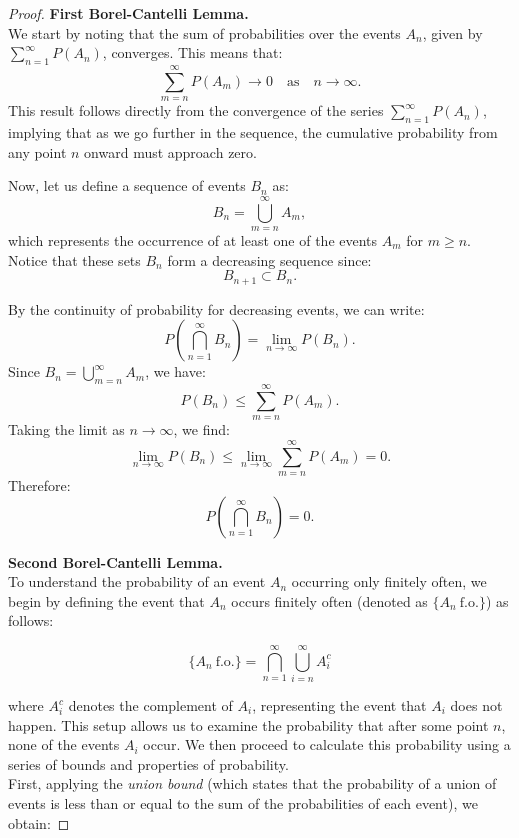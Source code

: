\begin{proof} \textbf{First Borel-Cantelli Lemma.}\\
    
    We start by noting that the sum of probabilities over the events \( A_n \), given by \( \sum_{n=1}^{\infty} P(A_n) \), converges. This means that:
\[
\sum_{m=n}^{\infty} P(A_m) \to 0 \quad \text{as} \quad n \to \infty.
\]
This result follows directly from the convergence of the series \( \sum_{n=1}^{\infty} P(A_n) \), implying that as we go further in the sequence, the cumulative probability from any point \( n \) onward must approach zero.

Now, let us define a sequence of events \( B_n \) as:
\[
B_n = \bigcup_{m=n}^{\infty} A_m,
\]
which represents the occurrence of at least one of the events \( A_m \) for \( m \geq n \). Notice that these sets \( B_n \) form a decreasing sequence since:
\[
B_{n+1} \subset B_n.
\]

By the continuity of probability for decreasing events, we can write:
\[
P\left( \bigcap_{n=1}^{\infty} B_n \right) = \lim_{n \to \infty} P(B_n).
\]
Since \( B_n = \bigcup_{m=n}^{\infty} A_m \), we have:
\[
P(B_n) \leq \sum_{m=n}^{\infty} P(A_m).
\]
Taking the limit as \( n \to \infty \), we find:
\[
\lim_{n \to \infty} P(B_n) \leq \lim_{n \to \infty} \sum_{m=n}^{\infty} P(A_m) = 0.
\]
Therefore:
\[
P\left( \bigcap_{n=1}^{\infty} B_n \right) = 0.
\]

\textbf{Second Borel-Cantelli Lemma.}\\

To understand the probability of an event \( A_n \) occurring only finitely often, we begin by defining the event that \( A_n \) occurs finitely often (denoted as \( \{ A_n \ \text{f.o.} \} \)) as follows:

\[
\{ A_n \ \text{f.o.} \} = \bigcap_{n=1}^{\infty} \bigcup_{i=n}^{\infty} A_i^c
\]

where \( A_i^c \) denotes the complement of \( A_i \), representing the event that \( A_i \) does not happen. This setup allows us to examine the probability that after some point \( n \), none of the events \( A_i \) occur. We then proceed to calculate this probability using a series of bounds and properties of probability.\\

First, applying the \textit{union bound} (which states that the probability of a union of events is less than or equal to the sum of the probabilities of each event), we obtain:


\end{proof}
